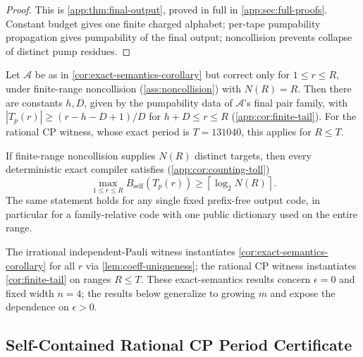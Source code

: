 \begin{proof}
This is \cref{app:thm:final-output}, proved in full in
\cref{app:sec:full-proofs}. Constant budget gives one finite
charged alphabet; per-tape pumpability propagation gives pumpability of the
final output; noncollision prevents collapse of distinct pump residues.
\end{proof}

\begin{corollary}
\label{cor:finite-tail}
Let $\mathcal A$ be as in \cref{cor:exact-semantics-corollary} but correct
only for $1\leq r\leq R$, under finite-range noncollision
(\cref{ass:noncollision}) with $N(R)=R$.  Then there are constants
$h,D$, given by the pumpability data of $\mathcal A$'s final pair family,
with $|T_p(r)| \geq (r-h-D+1)/D$ for $h+D \leq r \leq R$
(\cref{app:cor:finite-tail}).  For the rational CP witness, whose exact
period is $T=131040$, this applies for $R\leq T$.
\end{corollary}

\begin{corollary}
\label{cor:counting-toll}
If finite-range noncollision supplies $N(R)$ distinct targets, then every
deterministic exact compiler satisfies (\cref{app:cor:counting-toll})
\begin{equation*}
 \max_{1\leq r\leq R}B_{\mathrm{self}}(T_p(r))
 \geq \left\lceil\log_2N(R)\right\rceil.
\end{equation*}
The same statement holds for any single fixed prefix-free output code,
in particular for a family-relative code with one public dictionary used
on the entire range.
\end{corollary}

The irrational independent-Pauli witness instantiates
\cref{cor:exact-semantics-corollary} for all $r$ via
\cref{lem:coeff-uniqueness}; the rational CP witness instantiates
\cref{cor:finite-tail} on ranges $R \leq T$. These exact-semantics results
concern $\epsilon = 0$ and fixed width $n = 4$; the results below
generalize to growing $m$ and expose the dependence on $\epsilon>0$.


\subsection{Self-Contained Rational CP Period Certificate}
\label{app:sec:rational-period}

